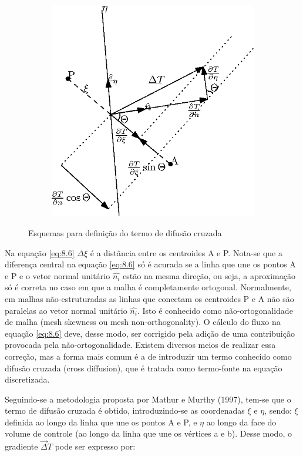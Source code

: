 \begin{figure}[ht]
    \begin{subfigure}{.5\textwidth}
        \centering
        \includegraphics[width=.8\linewidth]{fig/difusao-cruzada-c.eps}
        \caption{}
        \label{fig:8.1-c}
    \end{subfigure}

    \caption{Esquemas para definição do termo de difusão cruzada}
    \label{fig:8.1}
\end{figure}

Na equação \ref{eq:8.6} $\Delta \xi$ é a distância entre os centroides A e P. Nota-se que a diferença central na equação \ref{eq:8.6} só é acurada se a linha que une os pontos A e P e o vetor normal unitário $\hat{n_i}$ estão na mesma direção, ou seja, a aproximação só é correta no caso em que a malha é completamente ortogonal. Normalmente, em malhas não-estruturadas as linhas que conectam os centroides P e A não são paralelas ao vetor normal unitário $\hat{n_i}$. Isto é conhecido como não-ortogonalidade de malha (mesh skewness ou mesh non-orthogonality). O cálculo do fluxo na equação \ref{eq:8.6} deve, desse modo, ser corrigido pela adição de uma contribuição provocada pela não-ortogonalidade. Existem diversos meios de realizar essa correção, mas a forma mais comum é a de introduzir um termo conhecido como difusão cruzada (cross diffusion), que é tratada como termo-fonte na equação discretizada.

Seguindo-se a metodologia proposta por Mathur e Murthy (1997), tem-se que o termo de difusão cruzada é obtido, introduzindo-se as coordenadas $\xi$ e $\eta$, sendo: $\xi$ definida ao longo da linha que une os pontos A e P, e $\eta$ ao longo da face do volume de controle (ao longo da linha que une os vértices a e b). Desse modo, o gradiente $\vec{\Delta}T$ pode ser expresso por:

